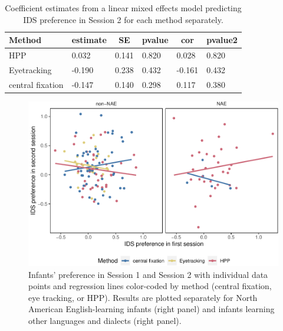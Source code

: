 \documentclass[
  english,
  man,floatsintext]{apa6}
\begin{document}
\begin{table}[tbp]

\begin{center}
\begin{threeparttable}

\caption{\label{tab:unnamed-chunk-5}Coefficient estimates from a linear mixed effects model predicting IDS preference in Session 2 for each method separately.}

\begin{tabular}{llllll}
\toprule
Method & \multicolumn{1}{c}{estimate} & \multicolumn{1}{c}{SE} & \multicolumn{1}{c}{pvalue} & \multicolumn{1}{c}{cor} & \multicolumn{1}{c}{pvalue2}\\
\midrule
HPP & 0.032 & 0.141 & 0.820 & 0.028 & 0.820\\
Eyetracking & -0.190 & 0.238 & 0.432 & -0.161 & 0.432\\
central fixation & -0.147 & 0.140 & 0.298 & 0.117 & 0.380\\
\bottomrule
\end{tabular}

\end{threeparttable}
\end{center}

\end{table}

\begin{figure}
\centering
\includegraphics{Retest_current_draft_files/figure-latex/fig1-1.pdf}
\caption{\label{fig:fig1}Infants' preference in Session 1 and Session 2 with individual data points and regression lines color-coded by method (central fixation, eye tracking, or HPP). Results are plotted separately for North American English-learning infants (right panel) and infants learning other languages and dialects (right panel).}
\end{figure}
\end{document}
